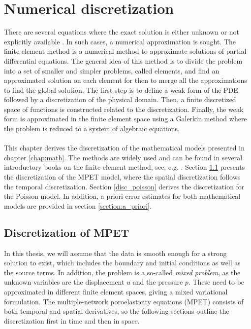 \chapter{Numerical discretization}
\label{chap:discretization}
There are several equations where the exact solution is either unknown or not explicitly available \cite{evans}. In such cases, a numerical approximation is sought. The finite element method is a numerical method to approximate solutions of partial differential equations. The general idea of this method is to divide the problem into a set of smaller and simpler problems, called elements, and find an approximated solution on each element for then to merge all the approximations to find the global solution. The first step is to define a weak form of the PDE followed by a discretization of the physical domain. Then, a finite discretized space of functions is constructed related to the discretization. Finally, the weak form is approximated in the finite element space using a Galerkin method where the problem is reduced to a system of algebraic equations. 
\\
\\
This chapter derives the discretization of the mathematical models presented in chapter \ref{chap:math}. The methods are widely used and can be found in several introductory books on the finite element method, see, e.g. \cite{brenner, ern, gatica}. Section \ref{section:disc_mpet} presents the discretization of the MPET model, where the spatial discretization follows the temporal discretization. Section \ref{disc_poisson} derives the discretization for the Poisson model. In addition, a priori error estimates for both mathematical models are provided in section \ref{section:a_priori}.

\section{Discretization of MPET} \label{section:disc_mpet}
In this thesis, we will assume that the data is smooth enough for a strong solution to exist, which includes the boundary and initial conditions as well as the source terms. In addition, the problem is a so-called \textit{mixed problem}, as the unknown variables are the displacement $u$ and the pressure $p$. These need to be approximated in different finite element spaces, giving a mixed variational formulation. The multiple-network poroelasticity equations (MPET) consists of both temporal and spatial derivatives, so the following sections outline the discretization first in time and then in space. 

